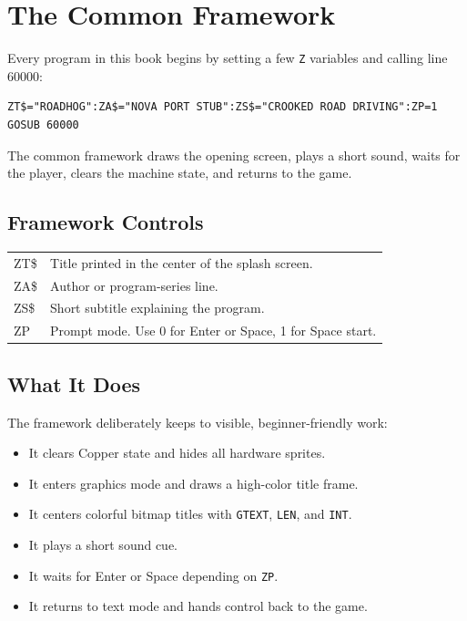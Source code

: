 \chapter{The Common Framework}

Every program in this book begins by setting a few \texttt{Z} variables and
calling line 60000:

\begin{lstlisting}
ZT$="ROADHOG":ZA$="NOVA PORT STUB":ZS$="CROOKED ROAD DRIVING":ZP=1
GOSUB 60000
\end{lstlisting}

The common framework draws the opening screen, plays a short sound, waits for
the player, clears the machine state, and returns to the game.

\section{Framework Controls}

\begin{center}
\begin{tabularx}{0.92\textwidth}{>{\ttfamily}lX}
\toprule
ZT\$ & Title printed in the center of the splash screen.\\
ZA\$ & Author or program-series line.\\
ZS\$ & Short subtitle explaining the program.\\
ZP & Prompt mode. Use 0 for Enter or Space, 1 for Space start.\\
\bottomrule
\end{tabularx}
\end{center}

\section{What It Does}

The framework deliberately keeps to visible, beginner-friendly work:

\begin{itemize}
\item It clears Copper state and hides all hardware sprites.
\item It enters graphics mode and draws a high-color title frame.
\item It centers colorful bitmap titles with \texttt{GTEXT}, \texttt{LEN}, and \texttt{INT}.
\item It plays a short sound cue.
\item It waits for Enter or Space depending on \texttt{ZP}.
\item It returns to text mode and hands control back to the game.
\end{itemize}

